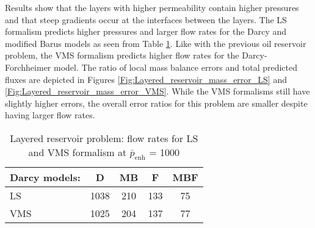 \documentclass[11pt,reqno]{amsart}
\begin{document}
Results show that the layers with higher permeability contain higher pressures and that 
steep gradients occur at the interfaces between the layers. The LS formalism predicts higher pressures 
and larger flow rates for the Darcy and modified Barus models as seen from Table 
\ref{Tab:layered_reservoir_flowrates}. Like with the previous oil reservoir problem, 
the VMS formalism predicts higher flow rates for the Darcy-Forchheimer model. 
The ratio of local mass balance errors and total predicted fluxes are depicted in 
Figures \ref{Fig:Layered_reservoir_mass_error_LS} and \ref{Fig:Layered_reservoir_mass_error_VMS}. 
While the VMS formalisms still have slightly higher errors, the overall error ratios for this problem 
are smaller despite having larger flow rates.
\begin{table}[t!]
  \centering
  \caption{Layered reservoir problem: flow rates for LS and VMS formalism at $\bar{p}_{\mathrm{enh}}$ = 1000}
  \begin{tabular}{l|cccc}
    \hline
    Darcy models: & D & MB & F & MBF \\ \hline
    LS & 1038 & 210 & 133 & 75 \\
    VMS & 1025 & 204 & 137 & 77 \\
    \hline
  \end{tabular}
  \label{Tab:layered_reservoir_flowrates}
\end{table}
\end{document}
